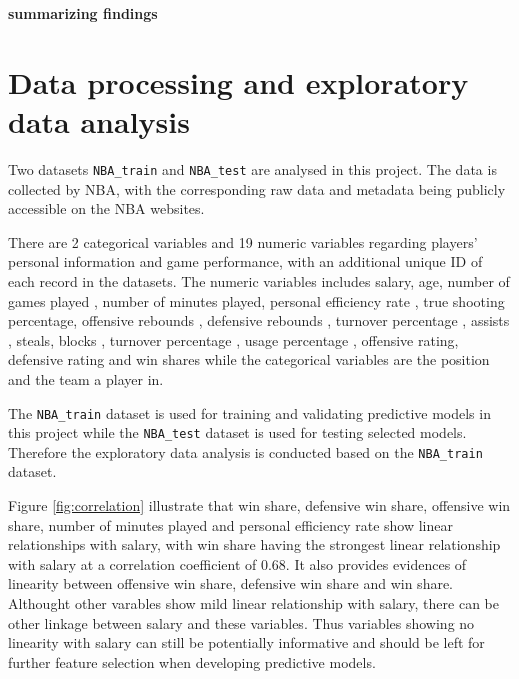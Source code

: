 \documentclass[letterpaper,12pt,twoside,]{pinp}
\begin{document}
\textbf{summarizing findings}

\hypertarget{data-processing-and-exploratory-data-analysis}{%
\section{Data processing and exploratory data
analysis}\label{data-processing-and-exploratory-data-analysis}}

Two datasets \texttt{NBA\_train} and \texttt{NBA\_test} are analysed in
this project. The data is collected by NBA, with the corresponding raw
data and metadata being publicly accessible on the NBA websites.

There are 2 categorical variables and 19 numeric variables regarding
players' personal information and game performance, with an additional
unique ID of each record in the datasets. The numeric variables includes
salary, age, number of games played , number of minutes played, personal
efficiency rate , true shooting percentage, offensive rebounds ,
defensive rebounds , turnover percentage , assists , steals, blocks ,
turnover percentage , usage percentage , offensive rating, defensive
rating and win shares while the categorical variables are the position
and the team a player in.

The \texttt{NBA\_train} dataset is used for training and validating
predictive models in this project while the \texttt{NBA\_test} dataset
is used for testing selected models. Therefore the exploratory data
analysis is conducted based on the \texttt{NBA\_train} dataset.

Figure \ref{fig:correlation} illustrate that win share, defensive win
share, offensive win share, number of minutes played and personal
efficiency rate show linear relationships with salary, with win share
having the strongest linear relationship with salary at a correlation
coefficient of 0.68. It also provides evidences of linearity between
offensive win share, defensive win share and win share. Althought other
varables show mild linear relationship with salary, there can be other
linkage between salary and these variables. Thus variables showing no
linearity with salary can still be potentially informative and should be
left for further feature selection when developing predictive models.
\end{document}
